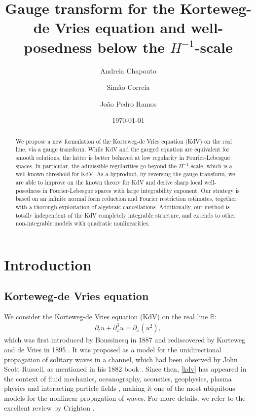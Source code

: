 \documentclass[a4paper,
11pt,  reqno]{amsart}
\title[Gauge transform for KdV and low regularity well-posedness]{Gauge transform for the Korteweg-de Vries equation and well-posedness below the $H^{-1}$-scale}
\author[A.~Chapouto \and S.~Correia \and J.~P.~Ramos]
{Andreia Chapouto \and Sim\~ao Correia \and Jo\~ao Pedro Ramos}
\date{\today}
\newcommand{\5}{\textup{V}}
\newcommand{\dx}{\partial_x}
\newcommand{\dt}{\partial_t}
\theoremstyle{remark}
\newcommand{\R}{\mathbb{R}}
\numberwithin{equation}{section}
\numberwithin{theorem}{section}
\begin{document}
\begin{abstract}


We propose a new formulation of the Korteweg-de Vries equation (KdV) on the real line, via a gauge transform.
While KdV and the gauged equation are equivalent for smooth solutions, the latter is better behaved at low regularity in Fourier-Lebesgue spaces. In particular, the admissible regularities go beyond the $H^{-1}$-scale, which is a well-known threshold for KdV. As a byproduct, by reversing the gauge transform, we are able to improve on the known theory for KdV and derive sharp local well-posedness in Fourier-Lebesgue spaces with large integrability exponent.
Our strategy is based on an infinite normal form reduction and Fourier restriction estimates, together with a thorough exploitation of algebraic cancellations. Additionally, our method is totally independent of the KdV completely integrable structure, and extends to other non-integrable models with quadratic nonlinearities. 
\end{abstract}
    
	\maketitle




    \section{Introduction}


    \subsection{Korteweg-de Vries equation}


We consider the Korteweg-de Vries equation (KdV) on the real line $\R$:
	\begin{align}
		\label{kdv}\tag{KdV}
		\dt u + \dx^3 u = \dx(u^2),
	\end{align}
	which was first introduced by Boussinesq in 1887 \cite{Boussinesq} and rediscovered by Korteweg and de Vries in 1895 \cite{KortewegDeVries}. It was proposed as a model for the unidirectional propagation of solitary waves in a channel, which had been observed by John Scott Russell, as mentioned in his 1882 book \cite{Russell}. Since then, \eqref{kdv} has appeared in the context of fluid mechanics, oceanography, acoustics, geophysics, plasma physics and interacting particle fields \cite{Fordy, CCR_particle,  Kuznetsov_Nakoryakov_Pokusaev_Shreiber_1978,    Nezlin, OlsonChristensen, StewartCorones,WashimiTaniuti}, making it one of the most ubiquitous models for the nonlinear propagation of waves. For more details, we refer to the excellent review by Crighton \cite{Crighton}.
	
\end{document}
